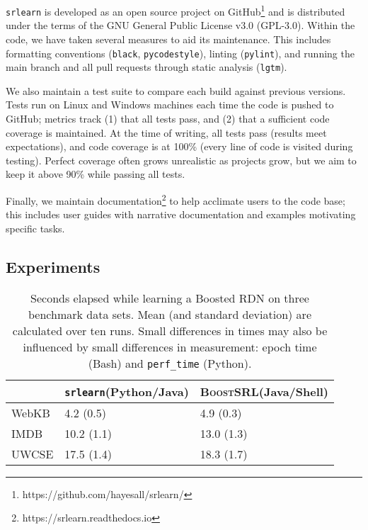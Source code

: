 \documentclass[letterpaper]{article}
\begin{document}
\texttt{srlearn} is developed as an open source project on
GitHub\footnote{https://github.com/hayesall/srlearn/} and is distributed
under the terms of the GNU General Public License v3.0 (GPL-3.0).
Within the code, we have taken several measures to aid its
maintenance. This includes formatting conventions (\texttt{black}, \texttt{pycodestyle}),
linting (\texttt{pylint}), and running the main branch and all pull
requests through static analysis (\texttt{lgtm}).

We also maintain a test suite to compare each
build against previous versions. Tests run on Linux and Windows
machines each time the code is pushed to GitHub; metrics track
(1) that all tests pass, and (2) that a
sufficient code coverage is maintained. At the time of writing,
all tests pass (results meet expectations), and code coverage
is at 100\% (every line of code is visited during testing).
Perfect coverage often grows unrealistic as projects
grow, but we aim to keep it above 90\% while passing all tests.

Finally, we maintain documentation\footnote{https://srlearn.readthedocs.io}
to help acclimate users to the
code base; this includes user guides with narrative documentation and
examples motivating specific tasks.

\subsection{Experiments}

\begin{table}
    \centering
    \begin{tabular}{l|ll|}
     & \multicolumn{1}{p{3cm}}{\texttt{srlearn}\newline (Python/Java)}
     & \multicolumn{1}{p{1.8cm}|}{\textsc{BoostSRL}\newline (Java/Shell)} \\
     \hline
    WebKB & 4.2 (0.5) & 4.9 (0.3) \\
    IMDB & 10.2 (1.1) & 13.0 (1.3) \\
    UWCSE & 17.5 (1.4) & 18.3 (1.7) \\
    \end{tabular}
    \caption{
        Seconds elapsed while learning a Boosted RDN on three benchmark data sets.
        Mean (and standard deviation) are calculated over ten runs. Small differences in
        times may also be influenced by small differences in measurement: epoch time (Bash)
        and \texttt{perf\_time} (Python).
    }
    \label{table:experiments}
\end{table}
\end{document}
